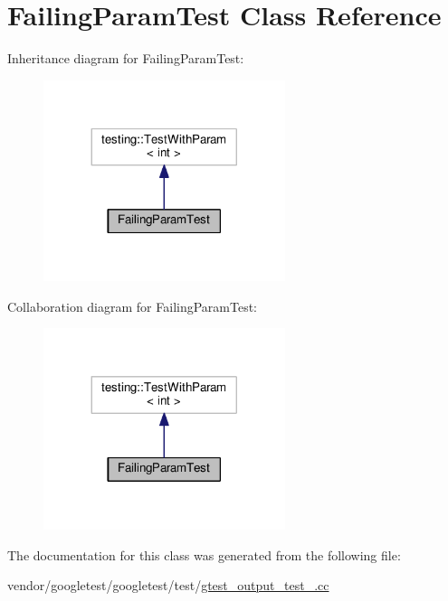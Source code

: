 \hypertarget{classFailingParamTest}{}\section{Failing\+Param\+Test Class Reference}
\label{classFailingParamTest}


Inheritance diagram for Failing\+Param\+Test\+:
\nopagebreak
\begin{figure}[H]
\begin{center}
\leavevmode
\includegraphics[width=200pt]{classFailingParamTest__inherit__graph}
\end{center}
\end{figure}


Collaboration diagram for Failing\+Param\+Test\+:
\nopagebreak
\begin{figure}[H]
\begin{center}
\leavevmode
\includegraphics[width=200pt]{classFailingParamTest__coll__graph}
\end{center}
\end{figure}


The documentation for this class was generated from the following file\+:\begin{DoxyCompactItemize}
\item 
vendor/googletest/googletest/test/\hyperlink{gtest__output__test___8cc}{gtest\+\_\+output\+\_\+test\+\_\+.\+cc}\end{DoxyCompactItemize}
